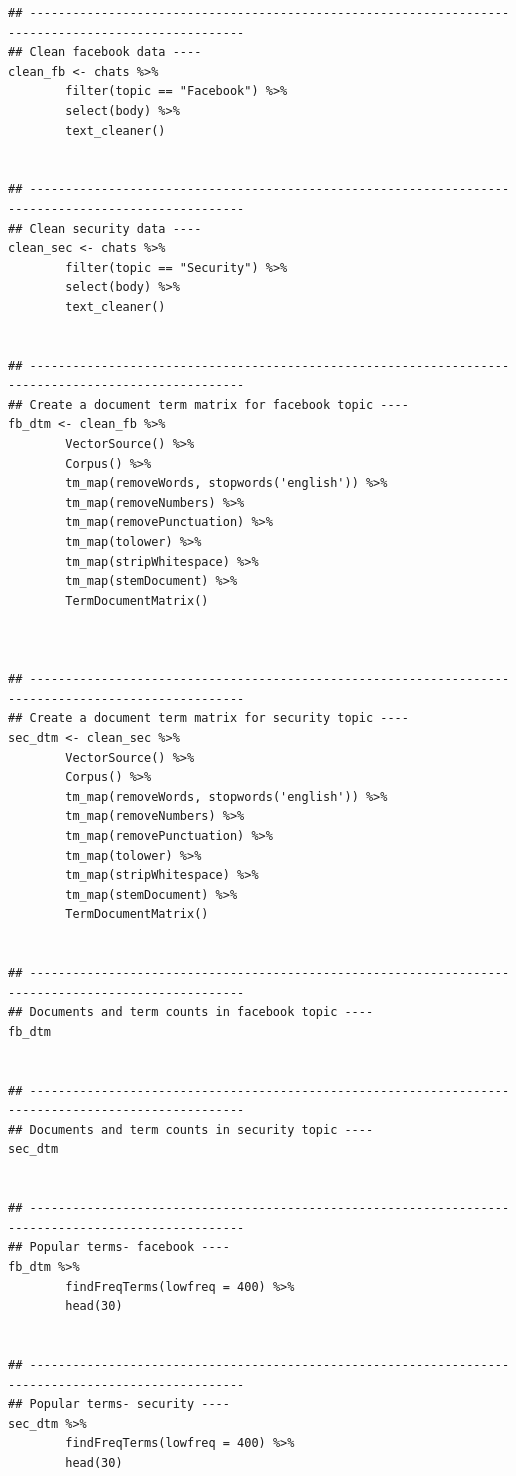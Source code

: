 \documentclass[
]{article}
\begin{document}
\begin{verbatim}
## ----------------------------------------------------------------------------------------------------
## Clean facebook data ----
clean_fb <- chats %>% 
        filter(topic == "Facebook") %>% 
        select(body) %>% 
        text_cleaner()


## ----------------------------------------------------------------------------------------------------
## Clean security data ----
clean_sec <- chats %>% 
        filter(topic == "Security") %>% 
        select(body) %>% 
        text_cleaner()


## ----------------------------------------------------------------------------------------------------
## Create a document term matrix for facebook topic ----
fb_dtm <- clean_fb %>% 
        VectorSource() %>% 
        Corpus() %>% 
        tm_map(removeWords, stopwords('english')) %>% 
        tm_map(removeNumbers) %>% 
        tm_map(removePunctuation) %>% 
        tm_map(tolower) %>% 
        tm_map(stripWhitespace) %>% 
        tm_map(stemDocument) %>% 
        TermDocumentMatrix()
        


## ----------------------------------------------------------------------------------------------------
## Create a document term matrix for security topic ----
sec_dtm <- clean_sec %>% 
        VectorSource() %>% 
        Corpus() %>% 
        tm_map(removeWords, stopwords('english')) %>% 
        tm_map(removeNumbers) %>% 
        tm_map(removePunctuation) %>% 
        tm_map(tolower) %>% 
        tm_map(stripWhitespace) %>% 
        tm_map(stemDocument) %>% 
        TermDocumentMatrix()


## ----------------------------------------------------------------------------------------------------
## Documents and term counts in facebook topic ----
fb_dtm


## ----------------------------------------------------------------------------------------------------
## Documents and term counts in security topic ----
sec_dtm


## ----------------------------------------------------------------------------------------------------
## Popular terms- facebook ----
fb_dtm %>% 
        findFreqTerms(lowfreq = 400) %>% 
        head(30)


## ----------------------------------------------------------------------------------------------------
## Popular terms- security ----
sec_dtm %>% 
        findFreqTerms(lowfreq = 400) %>% 
        head(30)



\end{verbatim}
\end{document}
